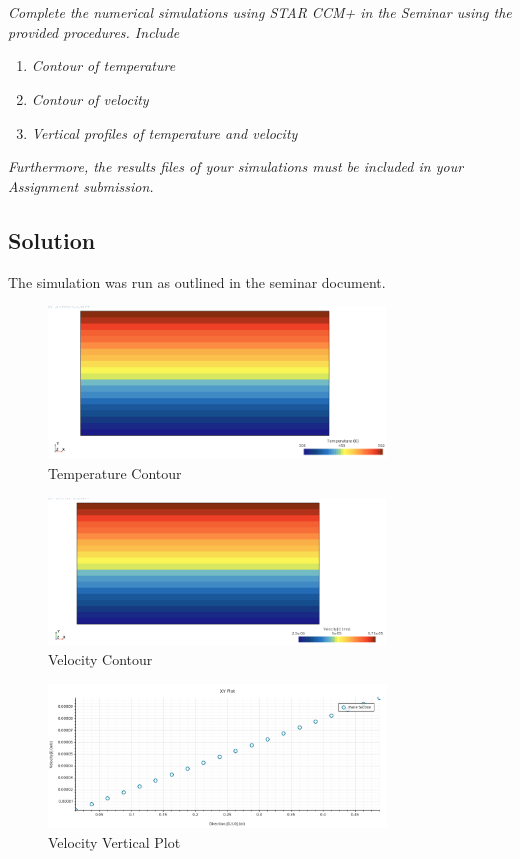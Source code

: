 \section{}
\textit{Complete the numerical simulations using STAR CCM+ in the Seminar using the provided procedures. Include}
\begin{enumerate}[label=(\arabic*)]
    \item \textit{Contour of temperature}
    \item \textit{Contour of velocity}
    \item \textit{Vertical profiles of temperature and velocity}
\end{enumerate}
\textit{Furthermore, the results files of your simulations must be included in your Assignment submission.}
\subsection*{Solution}
The simulation was run as outlined in the seminar document.
\begin{figure}[h]
    \centering
    \includegraphics[width=0.8\textwidth]{Questions/Figures/Temperature Contour.png}
    \caption{Temperature Contour}
    \label{fig:Temperature Contour}
\end{figure}
\begin{figure}[h]
    \centering
    \includegraphics[width=0.8\textwidth]{Questions/Figures/Velocity Contour.png}
    \caption{Velocity Contour}
    \label{fig:Velocity Contour}
\end{figure}
\begin{figure}[h]
    \centering
    \includegraphics[width=0.8\textwidth]{Questions/Figures/Velocity Vertical Plot .png}
    \caption{Velocity Vertical Plot}
    \label{fig:Velocity Vertical Plot}
\end{figure}
